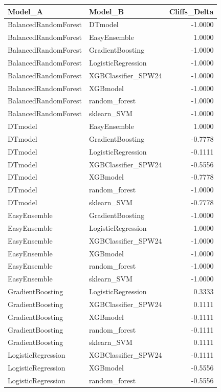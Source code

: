 \begin{table}[t]
\centering
\begin{tabular}{llr}
\toprule
Model_A & Model_B & Cliffs_Delta \\
\midrule
BalancedRandomForest & DTmodel & -1.0000 \\
BalancedRandomForest & EasyEnsemble & 1.0000 \\
BalancedRandomForest & GradientBoosting & -1.0000 \\
BalancedRandomForest & LogisticRegression & -1.0000 \\
BalancedRandomForest & XGBClassifier_SPW24 & -1.0000 \\
BalancedRandomForest & XGBmodel & -1.0000 \\
BalancedRandomForest & random_forest & -1.0000 \\
BalancedRandomForest & sklearn_SVM & -1.0000 \\
DTmodel & EasyEnsemble & 1.0000 \\
DTmodel & GradientBoosting & -0.7778 \\
DTmodel & LogisticRegression & -0.1111 \\
DTmodel & XGBClassifier_SPW24 & -0.5556 \\
DTmodel & XGBmodel & -0.7778 \\
DTmodel & random_forest & -1.0000 \\
DTmodel & sklearn_SVM & -0.7778 \\
EasyEnsemble & GradientBoosting & -1.0000 \\
EasyEnsemble & LogisticRegression & -1.0000 \\
EasyEnsemble & XGBClassifier_SPW24 & -1.0000 \\
EasyEnsemble & XGBmodel & -1.0000 \\
EasyEnsemble & random_forest & -1.0000 \\
EasyEnsemble & sklearn_SVM & -1.0000 \\
GradientBoosting & LogisticRegression & 0.3333 \\
GradientBoosting & XGBClassifier_SPW24 & 0.1111 \\
GradientBoosting & XGBmodel & -0.1111 \\
GradientBoosting & random_forest & -0.1111 \\
GradientBoosting & sklearn_SVM & 0.1111 \\
LogisticRegression & XGBClassifier_SPW24 & -0.1111 \\
LogisticRegression & XGBmodel & -0.5556 \\
LogisticRegression & random_forest & -0.5556 \\

\end{tabular}
\end{table}
